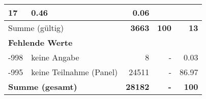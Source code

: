 \begin{longtable}{lXrrr}
       \num{17} &
       \num[round-mode=places,round-precision=2]{0.46} &
         \num[round-mode=places,round-precision=2]{0.06} \\
     \midrule
     \multicolumn{2}{l}{Summe (gültig)} &
       \textbf{\num{3663}} &
     \textbf{\num{100}} &
       \textbf{\num[round-mode=places,round-precision=2]{13}} \\
     \multicolumn{5}{l}{\textbf{Fehlende Werte}}\\
       -998 &
       keine Angabe &
         \num{8} &
        - &
         \num[round-mode=places,round-precision=2]{0.03} \\
       -995 &
       keine Teilnahme (Panel) &
         \num{24511} &
        - &
         \num[round-mode=places,round-precision=2]{86.97} \\
     \midrule
     \multicolumn{2}{l}{\textbf{Summe (gesamt)}} &
          \textbf{\num{28182}} &
        \textbf{-} &
        \textbf{\num{100}} \\
     \bottomrule
     \end{longtable}
     
